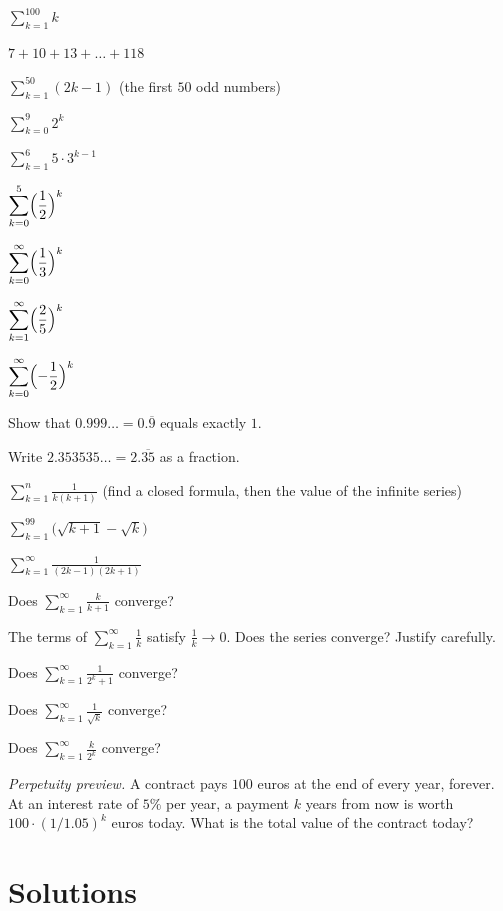 \begin{problems}
  \item $\displaystyle\sum_{k=1}^{100} k$
  \item $7+10+13+\dots+118$
  \item $\displaystyle\sum_{k=1}^{50}(2k-1)$ \quad (the first $50$ odd
        numbers)
  \item $\displaystyle\sum_{k=0}^{9} 2^{k}$
  \item $\displaystyle\sum_{k=1}^{6} 5\cdot 3^{k-1}$
  \item $\displaystyle\sum_{k=0}^{5}\Bigl(\frac12\Bigr)^{k}$
  \item $\displaystyle\sum_{k=0}^{\infty}\Bigl(\frac13\Bigr)^{k}$
  \item $\displaystyle\sum_{k=1}^{\infty}\Bigl(\frac25\Bigr)^{k}$
  \item $\displaystyle\sum_{k=0}^{\infty}\Bigl(-\frac12\Bigr)^{k}$
  \item Show that $0.999\ldots=0.\overline{9}$ equals exactly $1$.
  \item Write $2.353535\ldots=2.\overline{35}$ as a fraction.
  \item $\displaystyle\sum_{k=1}^{n}\frac{1}{k(k+1)}$ \quad (find a closed
        formula, then the value of the infinite series)
  \item $\displaystyle\sum_{k=1}^{99}\bigl(\sqrt{k+1}-\sqrt{k}\bigr)$
  \item $\displaystyle\sum_{k=1}^{\infty}\frac{1}{(2k-1)(2k+1)}$
  \item Does $\displaystyle\sum_{k=1}^{\infty}\frac{k}{k+1}$ converge?
  \item The terms of $\displaystyle\sum_{k=1}^{\infty}\frac{1}{k}$ satisfy
        $\frac{1}{k}\to 0$. Does the series converge? Justify carefully.
  \item Does $\displaystyle\sum_{k=1}^{\infty}\frac{1}{2^{k}+1}$ converge?
  \item Does $\displaystyle\sum_{k=1}^{\infty}\frac{1}{\sqrt{k}}$ converge?
  \item Does $\displaystyle\sum_{k=1}^{\infty}\frac{k}{2^{k}}$ converge?
  \item \emph{Perpetuity preview.} A contract pays $100$ euros at the end of
        every year, forever. At an interest rate of $5\%$ per year, a
        payment $k$ years from now is worth $100\cdot(1/1.05)^{k}$ euros
        today. What is the total value of the contract today?
\end{problems}

\section{Solutions}

